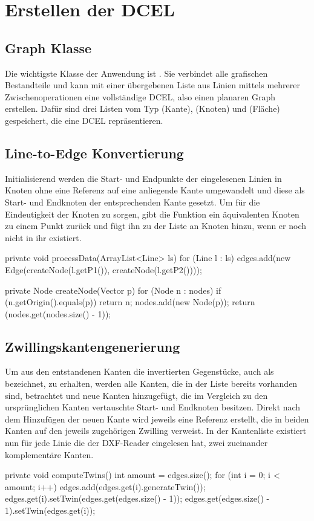 \section{Erstellen der DCEL}
\subsection{Graph Klasse}
Die wichtigste Klasse der Anwendung ist . 
Sie verbindet alle grafischen Bestandteile und kann mit einer übergebenen Liste aus Linien mittels mehrerer Zwischenoperationen eine vollständige DCEL, also einen planaren Graph erstellen.
Dafür sind drei Listen vom Typ (Kante), (Knoten) und (Fläche) gespeichert, die eine DCEL repräsentieren.
\subsection{Line-to-Edge Konvertierung}
\label{subsec:ltoe} 
Initialisierend werden die Start- und Endpunkte der eingelesenen Linien in Knoten ohne eine Referenz auf eine anliegende Kante umgewandelt und diese als Start- und Endknoten der entsprechenden Kante gesetzt.
Um für die Eindeutigkeit der Knoten zu sorgen, gibt die Funktion  ein äquivalenten Knoten zu einem Punkt zurück und fügt ihn zu der Liste an Knoten hinzu, wenn er noch nicht in ihr existiert.

\begin{code}
private void processData(ArrayList<Line> ls) {
	for (Line l : ls) {
		edges.add(new Edge(createNode(l.getP1()), createNode(l.getP2())));
	}
}
\end{code}
\begin{code}
private Node createNode(Vector p) {
	for (Node n : nodes) {
		if (n.getOrigin().equals(p)) {
			return n;
		}
	}
	nodes.add(new Node(p));
	return (nodes.get(nodes.size() - 1));
}
\end{code}
\subsection{Zwillingskantengenerierung}
Um aus den entstandenen Kanten die invertierten Gegenstücke, auch als  bezeichnet, zu erhalten, werden alle Kanten, die in der Liste bereits vorhanden sind, betrachtet und neue Kanten hinzugefügt, die im Vergleich zu den ursprünglichen Kanten vertauschte Start- und Endknoten besitzen.
Direkt nach dem Hinzufügen der neuen Kante wird jeweils eine Referenz erstellt, die in beiden Kanten auf den jeweils zugehörigen Zwilling verweist. 
In der Kantenliste existiert nun für jede Linie die der DXF-Reader eingelesen hat, zwei zueinander komplementäre Kanten.
\begin{code}
private void computeTwins() {
	int amount = edges.size();
	for (int i = 0; i < amount; i++) {
		edges.add(edges.get(i).generateTwin());
		edges.get(i).setTwin(edges.get(edges.size() - 1));
		edges.get(edges.size() - 1).setTwin(edges.get(i));
	}
}
\end{code}
